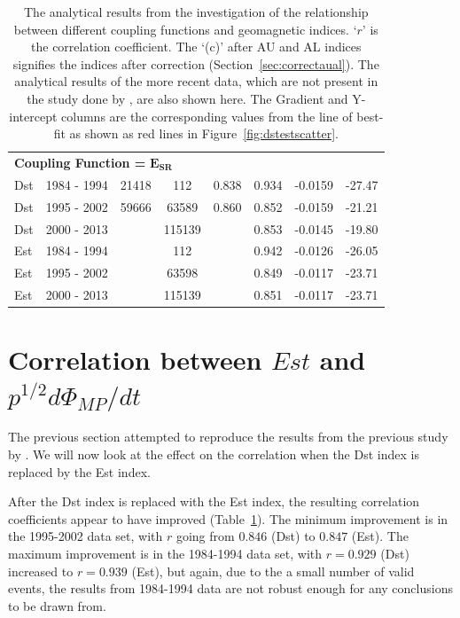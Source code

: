 \documentclass[12pt]{report} %
\begin{document}
\begin{table}
\begin{tabular}{lccccccc}
\multicolumn{8}{l}{{\bfseries Coupling Function =} $\mathbf{E_{SR}}$}  \\

Dst  & 1984 - 1994 & 21418& 112  &0.838& 0.934 &-0.0159&-27.47\\         
Dst & 1995 - 2002 & 59666 & 63589& 0.860 &0.852 &-0.0159&-21.21\\
Dst & 2000 - 2013 &  & 115139&  & 0.853 &-0.0145&-19.80 \\ \hline 
Est & 1984 - 1994& & 112&& 0.942 &-0.0126&-26.05 \\
Est & 1995 - 2002& & 63598& & 0.849 &-0.0117&-23.71\\
Est & 2000 - 2013&& 115139& & 0.851  &-0.0117&-23.71\\ \hline \hline
\end{tabular}
\vspace{0pt}
\caption{The analytical results from the investigation of the relationship between different coupling functions and geomagnetic indices. `$r$' is the correlation coefficient. The `(c)' after AU and AL indices signifies the indices after correction (Section~\ref{sec:correctaual}). The analytical results of the more recent data, which are not present in the study done by \cite{newell07}, are also shown here. The Gradient and Y-intercept columns are the corresponding values from the line of best-fit as shown as red lines in Figure~\ref{fig:dstestscatter}.} \label{tab:result}\vspace{-7pt}
\end{table}

\vspace{0pt}
\section{Correlation between $Est$ and ${p^{1/2}d\Phi_{MP}/dt}$}
\vspace{-5pt}
The previous section attempted to reproduce the results from the previous study by \cite{newell07}. We will now look at the effect on the correlation when the Dst index is replaced  by the Est index. 

After the Dst index is replaced with the Est index, the resulting correlation coefficients appear to have improved (Table~\ref{tab:result}). The minimum improvement is in the 1995-2002 data set, with $r$ going from $0.846$ (Dst) to $0.847$ (Est). The maximum improvement is in the 1984-1994 data set, with $r=0.929$ (Dst) increased to $r=0.939$ (Est), but again, due to the a small number of valid events, the results from 1984-1994 data are not robust enough for any conclusions to be drawn from. 
\end{document}
